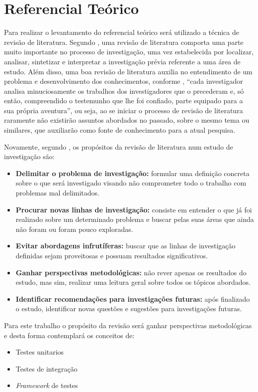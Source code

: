 \chapter{Referencial Teórico}
Para realizar o levantamento do referencial teórico será utilizado a técnica de revisão de literatura.
Segundo , uma revisão de literatura comporta uma parte muito importante no processo de investigação, 
uma vez estabelecida por localizar, analisar, sintetizar e interpretar a investigação prévia referente a uma área de estudo. 
Além disso, uma boa revisão de literatura auxilia no entendimento de um problema e desenvolvimento dos conhecimentos, 
conforme , “cada investigador analisa minuciosamente os trabalhos dos investigadores 
que o precederam e, só então, compreendido o testemunho que lhe foi confiado, parte equipado para a sua própria aventura”, 
ou seja, ao se iniciar o processo de revisão de literatura raramente não existirão assuntos abordados no passado, sobre o 
mesmo tema ou similares, que auxiliarão como fonte de conhecimento para a atual pesquisa.

Novamente, segundo , os propósitos da revisão de literatura num estudo de investigação são:

\begin{itemize}
 
	\item \textbf{Delimitar o problema de investigação:} formular uma definição concreta sobre o que será investigado visando não comprometer todo o trabalho com problemas mal delimitados.
	\item \textbf{Procurar novas linhas de investigação:} consiste em entender o que já foi realizado sobre um determinado problema e buscar pelas suas áreas que ainda não foram ou foram pouco exploradas.
	\item \textbf{Evitar abordagens infrutíferas:} buscar que as linhas de investigação definidas sejam proveitosas e possuam resultados significativos.
	\item \textbf{Ganhar perspectivas metodológicas:} não rever apenas os resultados do estudo, mas sim, realizar uma leitura geral sobre todos os tópicos abordados.
	\item \textbf{Identificar recomendações para investigações futuras:} após finalizado o estudo, identificar novas questões e sugestões para investigações futuras.

\end{itemize}

Para este trabalho o propósito da revisão será ganhar perspectivas metodológicas e desta forma contemplará os conceitos de:

\begin{itemize}

	\item Testes unitarios
	\item Testes de integração
	\item \textit{Framework} de testes
	
\end{itemize}

